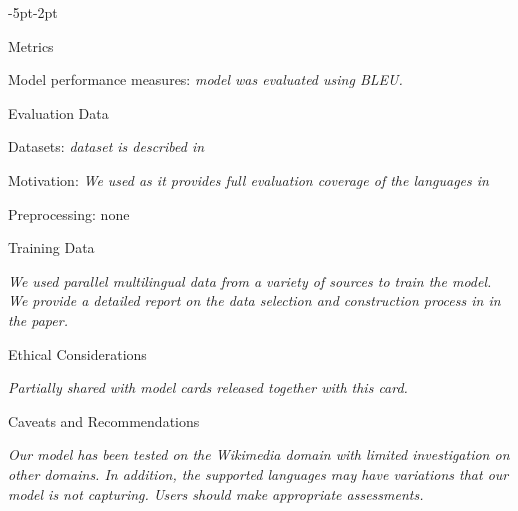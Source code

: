 \begin{adjustwidth}{-5pt}{-2pt}
\begin{singlespace}
\begin{tcolorbox}[title=\textbf{\section{Model Card - \sonar Speech Encoders}\label{card:sonar}},
    breakable, sharp corners, boxrule=0.5pt]
\begin{mcsection}{Metrics}
    \item Model performance measures: \textit{\sonar model was evaluated using BLEU.}
\end{mcsection}


\begin{mcsection}{Evaluation Data}
    \item Datasets: \textit{\fleurs dataset is described in \citet{fleurs2022arxiv}}
\item Motivation: \textit{We used \fleurs as it provides full evaluation coverage of the languages in \sonar}
\item Preprocessing: none
\end{mcsection}

\begin{mcsection}{Training Data}
\item \textit{We used parallel multilingual data from a variety of sources to train the model. 
We provide a detailed report on the data selection and construction process in  in the paper.
}
\end{mcsection}



\begin{mcsection}{Ethical Considerations}
 \item \textit{Partially shared with \mfourt model cards released together with this card.} 
\end{mcsection}


\begin{mcsection}{Caveats and Recommendations}
  \item \textit{Our model has been tested on the Wikimedia domain with limited investigation on other domains. In addition, the supported languages may have variations that our model is not capturing. Users should make appropriate assessments.}
\end{mcsection}

\end{tcolorbox}
\end{singlespace}
\end{adjustwidth}

